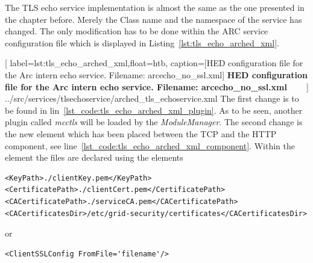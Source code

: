 The TLS echo service implementation is almost the same as the one presented in the chapter before. Merely the Class name and the namespace of the service has changed. The only modification has to be done within the ARC service configuration file which is displayed in Listing~\ref{lst:tls_echo_arched_xml}.


	[
	label=lst:tls_echo_arched_xml,float=htb,
	caption={[HED configuration file for the Arc intern echo service. Filename: arcecho\_no\_ssl.xml]
	\textbf{HED configuration file for the Arc intern echo service. Filename: arcecho\_no\_ssl.xml\textcolor{white}{hmf}}}
	]
{../src/services/tlsechoservice/arched_tls_echoservice.xml}
The first change is to be found in lin~\ref{lst_code:tls_echo_arched_xml_plugin}. As to be seen, another plugin called \textit{mcctls} will be loaded by the \textit{ModuleManager}. The second change is the new element which has been placed between the TCP and the HTTP component, see line~\ref{lst_code:tls_echo_arched_xml_component}. Within the element the files are declared using the elements
\begin{verbatim}
<KeyPath>./clientKey.pem</KeyPath>
<CertificatePath>./clientCert.pem</CertificatePath>
<CACertificatePath>./serviceCA.pem</CACertificatePath>
<CACertificatesDir>/etc/grid-security/certificates</CACertificatesDir>
\end{verbatim}
or
\begin{verbatim}
<ClientSSLConfig FromFile='filename'/>
\end{verbatim}


%
%
%
%
% 


